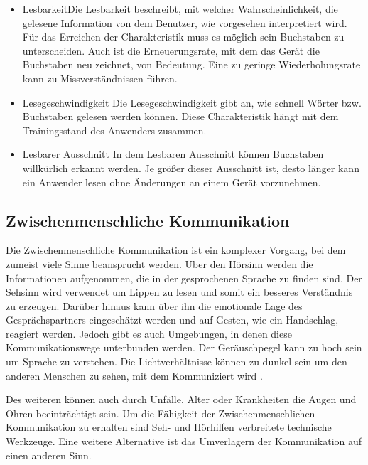 \documentclass{llncs}					%
\begin{document}
\begin{itemize}
	\item Lesbarkeit\newline Die Lesbarkeit beschreibt, mit welcher Wahrscheinlichkeit, die gelesene Information von dem Benutzer, wie vorgesehen interpretiert wird. Für das Erreichen der Charakteristik muss es möglich sein Buchstaben zu unterscheiden. Auch ist die Erneuerungsrate, mit dem das Gerät die Buchstaben neu zeichnet, von Bedeutung. Eine zu geringe Wiederholungsrate kann zu Missverständnissen führen.
	
	\item Lesegeschwindigkeit\newline
	Die Lesegeschwindigkeit gibt an, wie schnell Wörter bzw. Buchstaben gelesen werden können. Diese Charakteristik hängt mit dem Trainingsstand des Anwenders zusammen.
	
	\item Lesbarer Ausschnitt\newline
	In dem Lesbaren Ausschnitt können Buchstaben willkürlich erkannt werden. Je größer dieser Ausschnitt ist, desto länger kann ein Anwender lesen ohne Änderungen an einem Gerät vorzunehmen.
\end{itemize}


\subsection{Zwischenmenschliche Kommunikation}

Die Zwischenmenschliche Kommunikation ist ein komplexer Vorgang, bei dem zumeist viele Sinne beansprucht werden. Über den Hörsinn werden die Informationen aufgenommen, die in der gesprochenen Sprache zu finden sind. Der Sehsinn wird verwendet um Lippen zu lesen und somit ein besseres Verständnis zu erzeugen. Darüber hinaus kann über ihn die emotionale Lage des Gesprächspartners eingeschätzt werden und auf Gesten, wie ein Handschlag, reagiert werden.
Jedoch gibt es auch Umgebungen, in denen diese Kommunikationswege unterbunden werden. Der Geräuschpegel kann zu hoch sein um Sprache zu verstehen. Die Lichtverhältnisse können zu dunkel sein um den anderen Menschen zu sehen, mit dem Kommuniziert wird \cite{10.2307/1705360}.

Des weiteren können auch durch Unfälle, Alter oder Krankheiten die Augen und Ohren beeinträchtigt sein. Um die Fähigkeit der Zwischenmenschlichen Kommunikation zu erhalten sind Seh- und Hörhilfen verbreitete technische Werkzeuge. Eine weitere Alternative ist das Umverlagern der Kommunikation auf einen anderen Sinn\cite{10.2307/1705360}.
\end{document}
